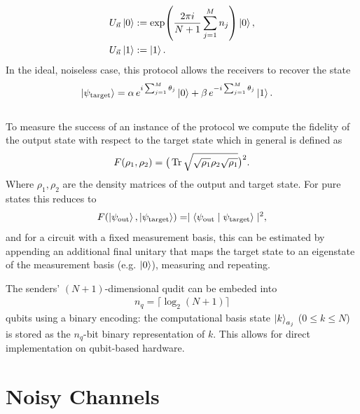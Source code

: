 \begin{align}
U_{\Vec{n}}\ket{0}
&:= \exp\!\left(\frac{2\pi i}{N+1}\sum_{j=1}^{M}n_j\right)\ket{0},
\\
U_{\Vec{n}}\ket{1}
&:= \ket{1}.
\end{align}
In the ideal, noiseless case, this protocol allows the receivers to recover the state
\begin{align}
\ket{\psi_{\mathrm{target}}}
&= \alpha\,e^{i\sum_{j=1}^{M}\theta_j}\ket{0} + \beta\,e^{-i\sum_{j=1}^{M}\theta_j}\ket{1}.
\end{align}
\\
%
To measure the success of an instance of the protocol we compute the fidelity of the output state with respect to the target state which in general is defined as
\begin{align}
    F(\rho_1, \rho_2) = \big(\operatorname{Tr}\sqrt{\sqrt{\rho_1}\rho_2\sqrt{\rho_1}} \big)^2.
\end{align}
Where $\rho_1, \rho_2$ are the density matrices of the output and target state. For pure states this reduces to 
\begin{align}
    F(\ket{\psi_{\mathrm{out}}}, \ket{\psi_{\mathrm{target}}}) = \mid 
    \braket{\psi_{\mathrm{out}} \mid \psi_{\mathrm{target}}}\mid^2,
\end{align}
and for a circuit with a fixed measurement basis, this can be estimated by appending an additional final unitary that maps the target state to an eigenstate of the measurement basis (e.g. $\ket{0}$), measuring and repeating. 

The senders' $(N{+}1)$-dimensional qudit can be embeded into
\begin{align}
n_q = \lceil \log_2(N+1) \rceil
\end{align}
qubits using a binary encoding: the computational basis state $\ket{k}_{a_j}$ ($0\le k\le N$) is stored as the $n_q$-bit binary representation of $k$. This allows for direct implementation on qubit-based hardware.


\section{Noisy Channels}

